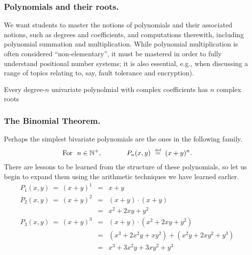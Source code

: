 \subsubsection{Polynomials and their roots.}
\label{sec:poly-roots}
We want students to master the notions of polynomials and their
associated notions, such as degrees and coefficients, and computations
therewith, including polynomial summation and multiplication.  While
polynomial multiplication is often considered ``non-elementary'', it
must be mastered in order to fully understand positional number
systems; it is also essential, e.g., when discussing a range of topics
relating to, say, fault tolerance and encryption).

\begin{theorem}
Every degree-$n$ univariate polynolmial with complex coefficients has
$n$ complex roots 
\end{theorem}

\subsubsection{The Binomial Theorem.}
\label{sec:Binomial-thm}

Perhaps the simplest bivariate polynomials are the ones in the
following family.
\begin{equation}
\label{eq:binomial-polys}
\mbox{For } \ n \in \mathbb{N}^+, \hspace*{.5in}
P_n(x,y) \ \stackrel{\mbox{{\tiny def}}}{=} \ (x+y)^n.
\end{equation}
There are lessons to be learned from the structure of these
polynomials, so let us begin to expand them using the arithmetic
techniques we have learned earlier.
\begin{eqnarray*}
P_1(x,y) \ = \
(x+y)^1 & = & x+y  \\
P_2(x,y) \ = \
(x+y)^2 & = & (x+y) \cdot (x+y) \\
        & = & x^2 + 2xy + y^2 \\
P_3(x,y) \ = \
(x+y)^3 & = & (x+y) \cdot (x^2 + 2xy + y^2) \\
   & = & (x^3 + 2x^2y +  xy^2) + (x^2y + 2xy^2 + y^3) \\
   & = & x^3 + 3x^2y + 3xy^2 + y^3  
\end{eqnarray*}

